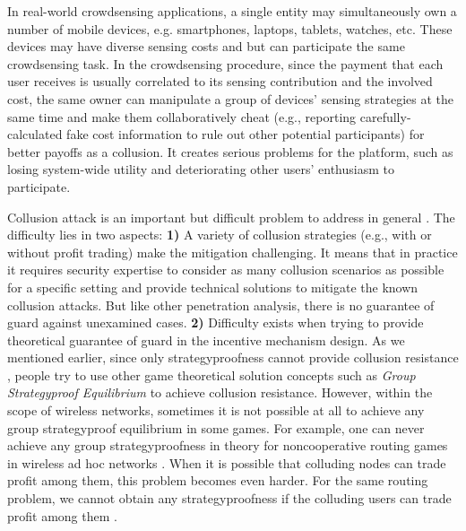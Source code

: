 \documentclass[conference]{IEEEtran}
\theoremstyle{definition}
\begin{document}

In real-world crowdsensing applications, a single entity may simultaneously own a number of mobile devices, e.g. smartphones, laptops, tablets, watches, etc. These devices may have diverse sensing costs and but can participate the same crowdsensing task. In the crowdsensing procedure, since the payment that each user receives is usually correlated to its sensing contribution and the involved cost, the same owner can manipulate a group of devices' sensing strategies at the same time and make them collaboratively cheat (e.g., reporting carefully-calculated fake cost information to rule out other potential participants) for better payoffs as a collusion. It creates serious problems for the platform, such as losing system-wide utility and deteriorating other users' enthusiasm to participate.

Collusion attack is an important but difficult problem to address in general \cite{zhong2007designing, wang2006low, jurca2007collusion}. 
The difficulty lies in two aspects: \textbf{1)} A variety of collusion strategies (e.g., with or without profit trading) make the mitigation challenging. It means that in practice it requires security expertise to consider as many collusion scenarios as possible for a specific setting and provide technical solutions to mitigate the known collusion attacks. But like other penetration analysis, there is no guarantee of guard against unexamined cases. \textbf{2)} Difficulty exists when trying to provide theoretical guarantee of guard in the incentive mechanism design. 
As we mentioned earlier, since only strategyproofness cannot provide collusion resistance \cite{zhong2007designing}, people try to use other game theoretical solution concepts such as \emph{Group Strategyproof Equilibrium} \cite{jain1999group} to achieve collusion resistance. %
However, within the scope of wireless networks, sometimes it is not possible at all to achieve any group strategyproof equilibrium in some games. For example, one can never achieve any group strategyproofness in theory for noncooperative routing games in wireless ad hoc networks \cite{zhong2007designing}. When it is possible that colluding nodes can trade profit among them, this problem becomes even harder. For the same routing problem, we cannot obtain any strategyproofness if the colluding users can trade profit among them \cite{wang2006low}.
\end{document}
